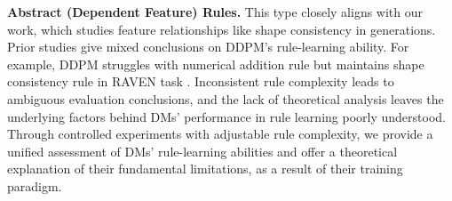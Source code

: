 \textbf{Abstract (Dependent Feature) Rules.} This type closely aligns with our work, which studies feature relationships like shape consistency in generations. Prior studies give mixed conclusions on DDPM's rule-learning ability. For example, DDPM struggles with numerical addition rule \cite{anonymous2025towards} but maintains shape consistency rule in RAVEN task \cite{wangdiffusion}. Inconsistent rule complexity leads to ambiguous evaluation conclusions, and the lack of theoretical analysis leaves the underlying factors behind DMs' performance in rule learning poorly understood. Through controlled experiments with adjustable rule complexity, we provide a unified assessment of DMs' rule-learning abilities and offer a theoretical explanation of their fundamental limitations, as a result of their training paradigm.